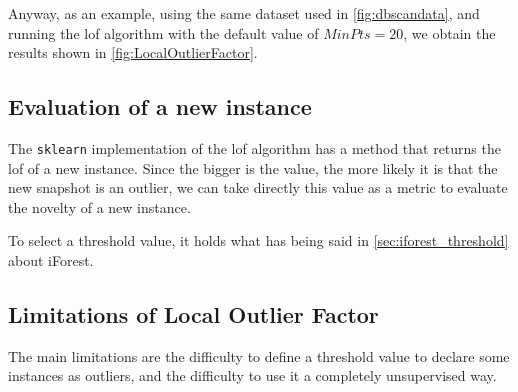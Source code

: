 Anyway, as an example, using the same dataset used in \autoref{fig:dbscandata}, and running the \gls{lof} algorithm with the default value of $MinPts=20$, we obtain the results shown in \autoref{fig:LocalOutlierFactor}.

\subsection{Evaluation of a new instance}
\label{sec:lof_eval}
The \texttt{sklearn} implementation of the \gls{lof} algorithm has a method that returns the \gls{lof} of a new instance. Since the bigger is the value, the more likely it is that the new snapshot is an outlier, we can take directly this value as a metric to evaluate the novelty of a new instance.

To select a threshold value, it holds what has being said in \autoref{sec:iforest_threshold} about iForest.


\subsection{Limitations of Local Outlier Factor}
\label{sec:lof_limitations}
The main limitations are the difficulty to define a threshold value to declare some instances as outliers, and the difficulty to use it a completely unsupervised way.


